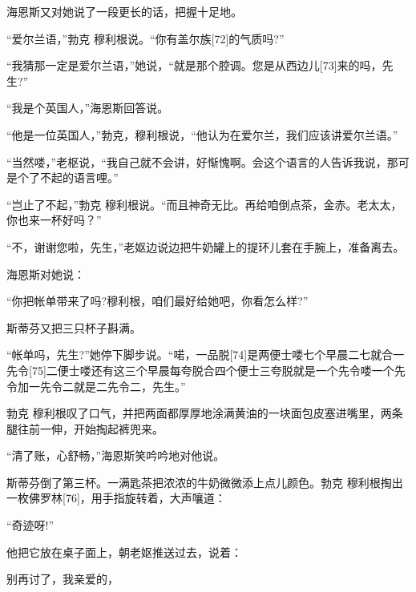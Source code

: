 \documentclass{article}
\begin{document}
海恩斯又对她说了一段更长的话，把握十足地。



“爱尔兰语，”勃克 \cdot 穆利根说。“你有盖尔族[72]的气质吗?”



“我猜那一定是爱尔兰语，”她说，“就是那个腔调。您是从西边儿[73]来的吗，先生?”



“我是个英国人，”海恩斯回答说。



“他是一位英国人，”勃克，穆利根说，“他认为在爱尔兰，我们应该讲爱尔兰语。”



“当然喽，”老枢说，“我自己就不会讲，好惭愧啊。会这个语言的人告诉我说，那可是个了不起的语言哩。”



“岂止了不起，”勃克 \cdot 穆利根说。“而且神奇无比。再给咱倒点茶，金赤。老太太，你也来一杯好吗？”



“不，谢谢您啦，先生，”老妪边说边把牛奶罐上的提环儿套在手腕上，准备离去。



海恩斯对她说：



“你把帐单带来了吗?穆利根，咱们最好给她吧，你看怎么样?”



斯蒂芬又把三只杯子斟满。



“帐单吗，先生?”她停下脚步说。“喏，一品脱[74]是两便士喽七个早晨二七就合一先令[75]二便士喽还有这三个早晨每夸脱合四个便士三夸脱就是一个先令喽一个先令加一先令二就是二先令二，先生。”



勃克 \cdot 穆利根叹了口气，并把两面都厚厚地涂满黄油的一块面包皮塞进嘴里，两条腿往前一伸，开始掏起裤兜来。



“清了账，心舒畅，”海恩斯笑吟吟地对他说。



斯蒂芬倒了第三杯。一满匙茶把浓浓的牛奶微微添上点儿颜色。勃克 \cdot 穆利根掏出一枚佛罗林[76]，用手指旋转着，大声嚷道：



“奇迹呀!”



他把它放在桌子面上，朝老妪推送过去，说着：



别再讨了，我亲爱的，
\end{document}
